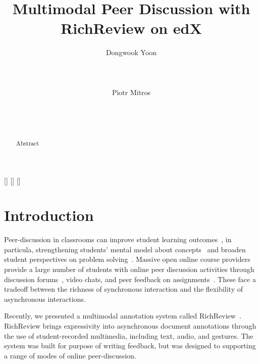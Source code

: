 \documentclass{sigchi}
\begin{document}
\title{Multimodal Peer Discussion with RichReview on edX}

\author{
  \alignauthor Dongwook Yoon\\
    \\
    \\
    \\
  \alignauthor Piotr Mitros\\
    \\
    \\
    \\
}

\maketitle

\begin{abstract}
Abstract
\end{abstract}


[] 
[] 
[] 

\section{Introduction}

Peer-discussion in classrooms can improve student learning outcomes~\cite{chi2014icap}, in particula, strengthening students’ mental model about concepts~\cite{nicol2003peer} and broaden student perspectives on problem solving~\cite{smith2009peer}.
Massive open online course providers provide a large number of students with online peer discussion activities through discussion forums~\cite{13Mitros6002}, video chats, and peer feedback on assignments~\cite{linc}. These face a tradeoff between the richness of synchronous interaction and the flexibility of asynchronous interactions.

Recently, we presented a multimodal annotation system called RichReview~\cite{yoon2014richreview}.
RichReview brings expressivity into asynchronous document annotations through the use of student-recorded multimedia, including text, audio, and gestures.
The system was built for purpose of writing feedback, but was designed to supporting a range of modes of online peer-discussion.
\end{document}
